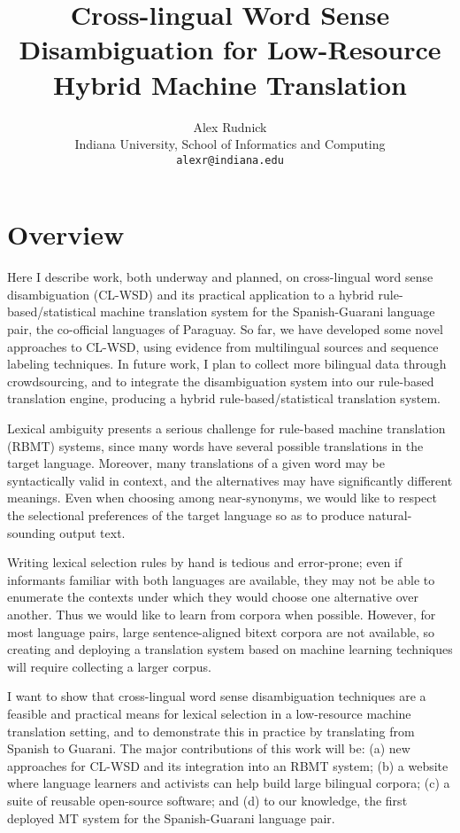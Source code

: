 \documentclass{article}
\title{Cross-lingual Word Sense Disambiguation for Low-Resource Hybrid Machine
Translation}
\author{Alex Rudnick \\
	    Indiana University, School of Informatics and Computing \\
	    {\tt alexr@indiana.edu}}
\date{}
\begin{document}
\maketitle

\section{Overview}
Here I describe work, both underway and planned, on cross-lingual word sense
disambiguation (CL-WSD) and its practical application to a hybrid
rule-based/statistical machine translation system for the Spanish-Guarani
language pair, the co-official languages of Paraguay.  So far, we have
developed some novel approaches to CL-WSD, using evidence from multilingual
sources and sequence labeling techniques. In future work, I plan to collect
more bilingual data through crowdsourcing, and to integrate the disambiguation
system into our rule-based translation engine, producing a hybrid
rule-based/statistical translation system.

Lexical ambiguity presents a serious challenge for rule-based machine
translation (RBMT) systems, since many words have several possible translations
in the target language. Moreover, many translations of a given word may
be syntactically valid in context, and the alternatives may have significantly
different meanings. Even when choosing among near-synonyms, we would like to
respect the selectional preferences of the target language so as to produce
natural-sounding output text.

Writing lexical selection rules by hand is tedious and error-prone; even if
informants familiar with both languages are available, they may not be able to
enumerate the contexts under which they would choose one alternative over
another. Thus we would like to learn from corpora when possible. However, for
most language pairs, large sentence-aligned bitext corpora are not available,
so creating and deploying a translation system based on machine learning 
techniques will require collecting a larger corpus.

I want to show that cross-lingual word sense disambiguation techniques are a
feasible and practical means for lexical selection in a low-resource machine
translation setting, and to demonstrate this in practice by translating from
Spanish to Guarani. The major contributions of this work will be: (a) new
approaches for CL-WSD and its integration into an RBMT system; (b) a website
where language learners and activists can help build large bilingual corpora;
(c) a suite of reusable open-source software; and (d) to our knowledge, the
first deployed MT system for the Spanish-Guarani language pair.
\end{document}
